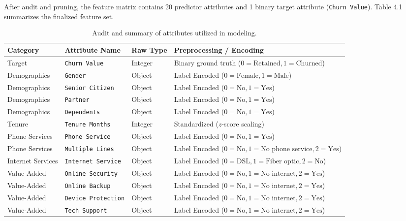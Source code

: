 \documentclass[12pt,oneside]{report}
\begin{document}
After audit and pruning, the feature matrix contains 20 predictor attributes and 1 binary target attribute (\texttt{Churn Value}). Table 4.1 summarizes the finalized feature set.

\begin{table}[H]
\centering
\small
\caption{Audit and summary of attributes utilized in modeling.}
\label{tab:4.1}
\vspace{0.05in}
\begin{tabular}{llll}
\toprule
\textbf{Category} & \textbf{Attribute Name} & \textbf{Raw Type} & \textbf{Preprocessing / Encoding} \\
\midrule
Target & \texttt{Churn Value} & Integer & Binary ground truth ($0 = \text{Retained}, 1 = \text{Churned}$) \\
Demographics & \texttt{Gender} & Object & Label Encoded ($0 = \text{Female}, 1 = \text{Male}$) \\
Demographics & \texttt{Senior Citizen} & Object & Label Encoded ($0 = \text{No}, 1 = \text{Yes}$) \\
Demographics & \texttt{Partner} & Object & Label Encoded ($0 = \text{No}, 1 = \text{Yes}$) \\
Demographics & \texttt{Dependents} & Object & Label Encoded ($0 = \text{No}, 1 = \text{Yes}$) \\
Tenure & \texttt{Tenure Months} & Integer & Standardized ($z$-score scaling) \\
Phone Services & \texttt{Phone Service} & Object & Label Encoded ($0 = \text{No}, 1 = \text{Yes}$) \\
Phone Services & \texttt{Multiple Lines} & Object & Label Encoded ($0 = \text{No}, 1 = \text{No phone service}, 2 = \text{Yes}$) \\
Internet Services & \texttt{Internet Service} & Object & Label Encoded ($0 = \text{DSL}, 1 = \text{Fiber optic}, 2 = \text{No}$) \\
Value-Added & \texttt{Online Security} & Object & Label Encoded ($0 = \text{No}, 1 = \text{No internet}, 2 = \text{Yes}$) \\
Value-Added & \texttt{Online Backup} & Object & Label Encoded ($0 = \text{No}, 1 = \text{No internet}, 2 = \text{Yes}$) \\
Value-Added & \texttt{Device Protection} & Object & Label Encoded ($0 = \text{No}, 1 = \text{No internet}, 2 = \text{Yes}$) \\
Value-Added & \texttt{Tech Support} & Object & Label Encoded ($0 = \text{No}, 1 = \text{No internet}, 2 = \text{Yes}$) \\

\end{tabular}
\end{table}
\end{document}
